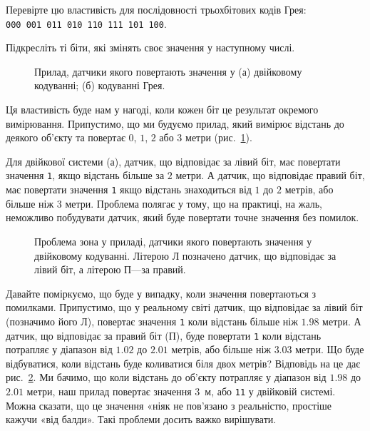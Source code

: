 \documentclass{book}
\newcommand{\bitstr}[1]{{\tt #1}}
\begin{document}
\begin{exercise}
Перевірте цю властивість для послідовності трьохбітових кодів Грея: \bitstr{000~001~011~010~110~111~101~100}.
\par Підкресліть ті біти, які змінять своє значення у наступному числі.
\end{exercise}

\begin{figure}[tb]
  \centering
  
  \caption{Прилад, датчики якого повертають значення у (а) двійковому кодуванні; (б) кодуванні Грея.}
  \label{Pic_Device}
\end{figure}

Ця властивість буде нам у нагоді, коли кожен біт це результат окремого вимірювання.
Припустимо, що ми будуємо прилад, який вимірює відстань до деякого об'єкту та повертає $0$, $1$, $2$ або $3$ метри (рис.~\ref{Pic_Device}).

Для двійкової системи (а), датчик, що відповідає за лівий біт, має повертати значення \bitstr{1}, якщо відстань більше за $2$ метри.
А датчик, що відповідає правий біт, має повертати значення \bitstr{1} якщо відстань знаходиться від $1$ до $2$ метрів, або більше ніж $3$ метри.
Проблема полягає у тому, що на практиці, на жаль, неможливо побудувати датчик, який буде повертати точне значення без помилок.

\begin{figure}[t]
  \centering
  
  \caption{Проблема зона у приладі, датчики якого повертають значення у двійковому кодуванні.
           Літерою Л позначено датчик, що відповідає за лівий біт, а літерою П---за правий.}
  \label{Pic_DeviceError}
\end{figure}

Давайте поміркуємо, що буде у випадку, коли значення повертаються з помилками.
Припустимо, що у реальному світі датчик, що відповідає за лівий біт (позначимо його Л), повертає значення \bitstr{1} коли відстань більше ніж $1.98$ метри.
А датчик, що відповідає за правий біт (П), буде повертати \bitstr{1} коли відстань потрапляє у діапазон від $1.02$ до $2.01$ метрів, або більше ніж $3.03$ метри.
Що буде відбуватися, коли відстань буде коливатися біля двох метрів?
Відповідь на це дає рис.~\ref{Pic_DeviceError}.
Ми бачимо, що коли відстань до об'єкту потрапляє у діапазон від $1.98$ до $2.01$ метри, наш прилад повертає значення $3$~м, або \bitstr{11} у двійковій системі.
Можна сказати, що це значення «ніяк не пов'язано з реальністю, простіше кажучи «від балди».
Такі проблеми досить важко вирішувати.
\end{document}

